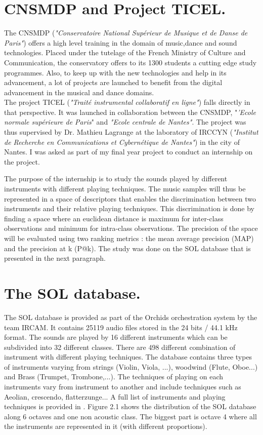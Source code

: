\documentclass[hidelinks,12pt]{report}
\begin{document}
\section{CNSMDP and Project TICEL.}
The CNSMDP  (\textit{"Conservatoire National Supérieur de Musique et de Danse de Paris"}) offers a high level training in the domain of music,dance and sound technologies. Placed under the tutelage of the French Ministry of Culture and Communication, the conservatory offers to its 1300 students a cutting edge study programmes. Also, to keep up with the new technologies and help in its advancement, a lot of projects are launched to benefit from the digital advancement in the musical and dance domains. \\
The project TICEL (\textit{"Traité instrumental collaboratif en ligne"}) falls directly in that perspective. It was launched in collaboration between the CNSMDP, "\textit{'Ecole normale supérieure de Paris}" and \textit{"Ecole centrale de Nantes"}. The project was thus supervised by Dr. Mathieu Lagrange at the laboratory of IRCCYN (\textit{"Institut de Recherche en Communications et Cybernétique de Nantes"}) in the city of Nantes. I was asked as part of my final year project to conduct an internship on the project. \par
The purpose of the internship is to study the sounds played by different instruments with different playing techniques. The music samples will thus be represented in a space of descriptors that enables the  discrimination between two instruments and their relative playing techniques. This discrimination is done by finding a space where an euclidean distance is maximum for inter-class observations and minimum for intra-class observations. The precision of the space will be evaluated using two ranking metrics : the mean average precision (MAP) and the precision at k (P@k). The study was done on the SOL database that is presented in the next paragraph.  \\ 

\section{The SOL database.}
The SOL database is provided as part of the Orchids orchestration system by the team IRCAM. It contains 25119 audio files stored in the 24 bits / 44.1 kHz format. The sounds are played by 16 different instruments which can be subdivided into 32 different classes. There are 498 different combination of instrument with different playing techniques. The database contains three types of instruments varying from strings (Violin, Viola, ...), woodwind (Flute, Oboe...) and Brass (Trumpet, Trombone,...). The techniques of playing on each instruments vary from instrument to another and include techniques such as Aeolian, crescendo, flatterzunge... A full list of instruments and playing techniques is provided in \cite{SOL}.
Figure 2.1 shows the distribution of the SOL database along 6 octaves and one non acoustic class. The biggest part is octave 4 where all the instruments are represented in it (with different proportions).
\end{document}
